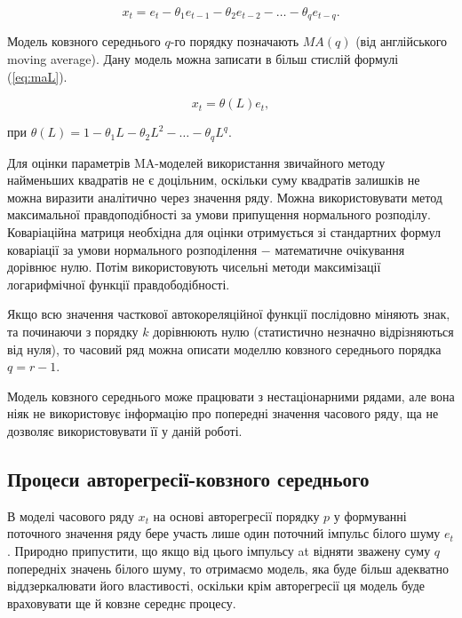 \begin{equation}\label{eq:movingaverage}
x_{t} = e_{t} - \theta_{1}e_{t-1} - \theta_{2}e_{t-2} - \dots - \theta_{q}e_{t-q}.
\end{equation}

\vspace{1.5em}


Модель ковзного середнього $q$-го порядку позначають $MA(q)$ (від англійського moving average). Дану модель можна записати в більш стислій формулі (\ref{eq:maL}).

\begin{equation}\label{eq:maL}
x_{t} = \theta(L)e_{t},
\end{equation}

\noindent при $\theta(L) = 1 - \theta_{1}L - \theta_{2}L^{2} - \dots - \theta_{q}L^{q}$.

\vspace{1.5em}


Для оцінки параметрів MA-моделей використання звичайного методу найменьших квадратів не є доцільним, оскільки суму квадратів залишків не можна виразити аналітично через значення ряду. Можна використовувати метод максимальної правдоподібності за умови припущення нормального розподілу. Коваріаційна матриця необхідна для оцінки отримується зі стандартних формул коваріації за умови нормального розподілення $-$ математичне очікування дорівнює нулю. Потім використовують чисельні методи максимізації логарифмічної функції правдободібності.

Якщо всю значення часткової автокореляційної функції послідовно міняють знак, та починаючи з порядку $k$ дорівнюють нулю (статистично незначно відрізняються від нуля), то часовий ряд можна описати моделлю ковзного середнього порядка $q=r-1$.

Модель ковзного середнього може працювати з нестаціонарними рядами, але вона ніяк не використовує інформацію про попередні значення часового ряду, ща не дозволяє використовувати її у даній роботі.

\subsection{Процеси авторегресії-ковзного середнього}

В моделі часового ряду $x_{t}$ на основі авторегресії порядку $p$ у формуванні поточного значення ряду бере участь лише один поточний імпульс білого шуму $e_{t}$. Природно припустити, що якщо від цього імпульсу at відняти зважену суму $q$ попередніх значень білого шуму, то отримаємо модель, яка буде більш адекватно віддзеркалювати його властивості, оскільки крім авторегресії ця модель буде враховувати ще й ковзне середнє процесу.

